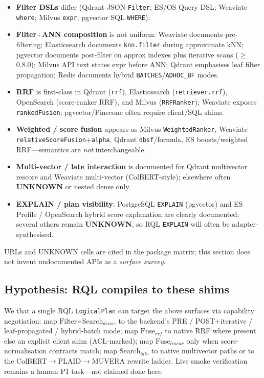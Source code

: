 \begin{itemize}
  \item \textbf{Filter DSLs} differ (Qdrant JSON \texttt{Filter}; ES/OS Query DSL; Weaviate \texttt{where}; Milvus \texttt{expr}; pgvector SQL \texttt{WHERE}).
  \item \textbf{Filter$+$ANN composition} is not uniform: Weaviate documents pre-filtering; Elasticsearch documents \texttt{knn.filter} during approximate kNN; pgvector documents post-filter on approx indexes plus iterative scans ($\geq$0.8.0); Milvus API text states expr before ANN; Qdrant emphasises leaf filter propagation; Redis documents hybrid \texttt{BATCHES}/\texttt{ADHOC\_BF} modes.
  \item \textbf{RRF} is first-class in Qdrant (\texttt{rrf}), Elasticsearch (\texttt{retriever.rrf}), OpenSearch (score-ranker RRF), and Milvus (\texttt{RRFRanker}); Weaviate exposes \texttt{rankedFusion}; pgvector/Pinecone often require client/SQL shims.
  \item \textbf{Weighted / score fusion} appears as Milvus \texttt{WeightedRanker}, Weaviate \texttt{relativeScoreFusion}+\texttt{alpha}, Qdrant \texttt{dbsf}/formula, ES boosts/weighted RRF---semantics are \emph{not} interchangeable.
  \item \textbf{Multi-vector / late interaction} is documented for Qdrant multivector rescore and Weaviate multi-vector (ColBERT-style); elsewhere often \textbf{UNKNOWN} or nested dense only.
  \item \textbf{EXPLAIN / plan visibility}: PostgreSQL \texttt{EXPLAIN} (pgvector) and ES Profile / OpenSearch hybrid score explanation are clearly documented; several others remain \textbf{UNKNOWN}, so RQL \texttt{EXPLAIN} will often be adapter-synthesised.
\end{itemize}

\noindent URLs and UNKNOWN cells are cited in the package matrix; this section does not invent undocumented APIs \established{} as a \emph{surface survey}.

\subsection{Hypothesis: RQL compiles to these shims}
\label{sec:compile-hypothesis}
We \hypothesis{} that a single RQL \texttt{LogicalPlan} can target the above surfaces via capability negotiation: map $\mathrm{Filter}\circ\mathrm{Search}_{dense}$ to the backend's PRE / POST$+$iterative / leaf-propagated / hybrid-batch mode; map $\mathrm{Fuse}_{rrf}$ to native RRF where present else an explicit client shim (ACL-marked); map $\mathrm{Fuse}_{linear}$ only when score-normalisation contracts match; map $\mathrm{Search}_{late}$ to native multivector paths or to the ColBERT$\rightarrow$PLAID$\rightarrow$MUVERA rewrite ladder.
Live smoke verification remains a human P1 task---not claimed done here.

